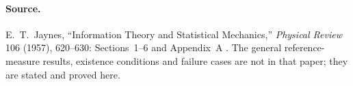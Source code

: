 \paragraph{Source.}
E.~T.~Jaynes, ``Information Theory and Statistical Mechanics,'' \emph{Physical
Review} 106 (1957), 620--630: Sections~1--6 and Appendix~A
\cite{Jaynes1957InformationTheory}. The general reference-measure results,
existence conditions and failure cases are not in that paper; they are stated and
proved here.

